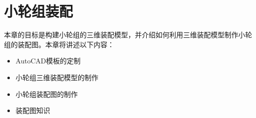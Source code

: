 \chapter{小轮组装配}

本章的目标是构建小轮组的三维装配模型，并介绍如何利用三维装配模型制作小轮组的装配图。本章将讲述以下内容：
\begin{itemize}
\item AutoCAD模板的定制
\item 小轮组三维装配模型的制作
\item 小轮组装配图的制作
\item 装配图知识
\end{itemize}




\endinput